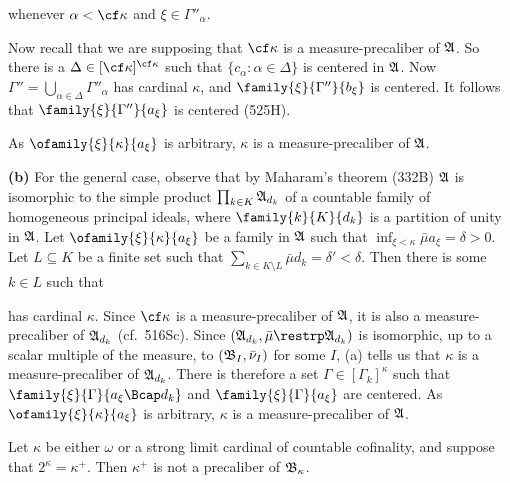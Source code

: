 {

\noindent whenever $\alpha<\cf\kappa$ and $\xi\in\Gamma''_{\alpha}$.

Now recall that we are supposing that $\cf\kappa$ is a
measure-precaliber of
$\frak A$.   So there is a $\Delta\in[\cf\kappa]^{\cf\kappa}$ such that
$\{c_{\alpha}:\alpha\in\Delta\}$ is centered in $\frak A$.   Now
$\Gamma''=\bigcup_{\alpha\in\Delta}\Gamma''_{\alpha}$ has cardinal
$\kappa$, and $\family{\xi}{\Gamma''}{b_{\xi}}$ is centered.   It
follows that $\family{\xi}{\Gamma''}{a_{\xi}}$ is
centered (525H).

As $\ofamily{\xi}{\kappa}{a_{\xi}}$ is arbitrary, $\kappa$ is a
measure-precaliber of $\frak A$.

\medskip

{\bf (b)} For the general case, observe that by Maharam's theorem (332B)
$\frak A$ is isomorphic to the simple product
$\prod_{k\in K}\frak A_{d_k}$ of a countable family of homogeneous
principal ideals, where $\family{k}{K}{d_k}$ is a partition of unity in
$\frak A$.   Let $\ofamily{\xi}{\kappa}{a_{\xi}}$ be a family in
$\frak A$ such that $\inf_{\xi<\kappa}\bar\mu a_{\xi}=\delta>0$.   Let
$L\subseteq K$ be a finite set such that
$\sum_{k\in K\setminus L}\bar\mu d_k=\delta'<\delta$.   Then there is
some $k\in L$ such that


\noindent has cardinal $\kappa$.   Since $\cf\kappa$ is a
measure-precaliber of $\frak A$, it is also a measure-precaliber of
$\frak A_{d_k}$ (cf.\ 516Sc).   Since
$(\frak A_{d_k},\bar\mu\restrp\frak A_{d_k})$ is isomorphic, up to a
scalar multiple of the measure, to $(\frak B_I,\bar\nu_I)$ for some $I$,
(a) tells us that $\kappa$ is a measure-precaliber of $\frak A_{d_k}$.
There is therefore a set $\Gamma\in[\Gamma_k]^{\kappa}$ such that
$\family{\xi}{\Gamma}{a_{\xi}\Bcap d_k}$ and
$\family{\xi}{\Gamma}{a_{\xi}}$ are centered.   As
$\ofamily{\xi}{\kappa}{a_{\xi}}$ is arbitrary, $\kappa$ is a
measure-precaliber of $\frak A$.
}%

Let $\kappa$ be either $\omega$ or a strong limit cardinal of countable
cofinality, and suppose that $2^{\kappa}=\kappa^+$.   Then $\kappa^+$ is
not a precaliber of $\frak B_{\kappa}$.


